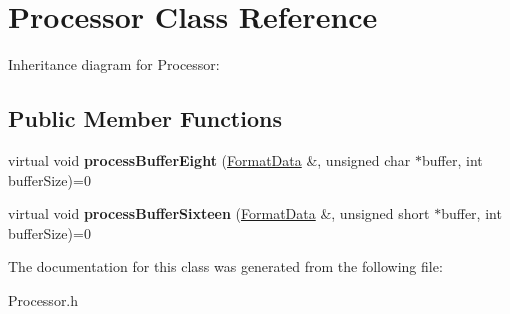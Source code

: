 \hypertarget{classProcessor}{}\section{Processor Class Reference}
\label{classProcessor}


Inheritance diagram for Processor\+:
\subsection*{Public Member Functions}
\begin{DoxyCompactItemize}
\item 
\mbox{\label{classProcessor_ad26d4e12eedcb62dc125194009aae0b1}} 
virtual void {\bfseries process\+Buffer\+Eight} (\hyperlink{structFormatData}{Format\+Data} \&, unsigned char $\ast$buffer, int buffer\+Size)=0
\item 
\mbox{\label{classProcessor_ab9b3d0b5527b91d390d8b56916429267}} 
virtual void {\bfseries process\+Buffer\+Sixteen} (\hyperlink{structFormatData}{Format\+Data} \&, unsigned short $\ast$buffer, int buffer\+Size)=0
\end{DoxyCompactItemize}


The documentation for this class was generated from the following file\+:\begin{DoxyCompactItemize}
\item 
Processor.\+h\end{DoxyCompactItemize}
